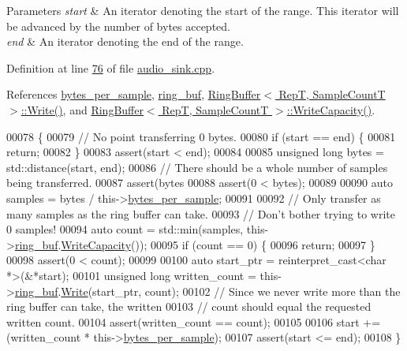 \begin{DoxyParams}{Parameters}
{\em start} & An iterator denoting the start of the range. This iterator will be advanced by the number of bytes accepted. \\
\hline
{\em end} & An iterator denoting the end of the range. \\
\hline
\end{DoxyParams}


Definition at line \hyperlink{audio__sink_8cpp_source_l00076}{76} of file \hyperlink{audio__sink_8cpp_source}{audio\+\_\+sink.\+cpp}.



References \hyperlink{audio__sink_8hpp_source_l00140}{bytes\+\_\+per\+\_\+sample}, \hyperlink{audio__sink_8hpp_source_l00143}{ring\+\_\+buf}, \hyperlink{ringbuffer_8hpp_source_l00120}{Ring\+Buffer$<$ Rep\+T, Sample\+Count\+T $>$\+::\+Write()}, and \hyperlink{ringbuffer_8hpp_source_l00083}{Ring\+Buffer$<$ Rep\+T, Sample\+Count\+T $>$\+::\+Write\+Capacity()}.


\begin{DoxyCode}
00078 \{
00079     \textcolor{comment}{// No point transferring 0 bytes.}
00080     \textcolor{keywordflow}{if} (start == end) \{
00081         \textcolor{keywordflow}{return};
00082     \}
00083     assert(start < end);
00084 
00085     \textcolor{keywordtype}{unsigned} \textcolor{keywordtype}{long} bytes = std::distance(start, end);
00086     \textcolor{comment}{// There should be a whole number of samples being transferred.}
00087     assert(bytes %
00088     assert(0 < bytes);
00089 
00090     \textcolor{keyword}{auto} samples = bytes / this->\hyperlink{classAudioSink_a5eab0f7111187c0416feb542010e4a2e}{bytes\_per\_sample};
00091 
00092     \textcolor{comment}{// Only transfer as many samples as the ring buffer can take.}
00093     \textcolor{comment}{// Don't bother trying to write 0 samples!}
00094     \textcolor{keyword}{auto} count = std::min(samples, this->\hyperlink{classAudioSink_a87184f85d6cfcc7310043b877caeaee2}{ring\_buf}.\hyperlink{classRingBuffer_ab00617ab6e379ad146cb7b80079f4c4c}{WriteCapacity}());
00095     \textcolor{keywordflow}{if} (count == 0) \{
00096         \textcolor{keywordflow}{return};
00097     \}
00098     assert(0 < count);
00099 
00100     \textcolor{keyword}{auto} start\_ptr = \textcolor{keyword}{reinterpret\_cast<}\textcolor{keywordtype}{char} *\textcolor{keyword}{>}(&*start);
00101     \textcolor{keywordtype}{unsigned} \textcolor{keywordtype}{long} written\_count = this->\hyperlink{classAudioSink_a87184f85d6cfcc7310043b877caeaee2}{ring\_buf}.\hyperlink{classRingBuffer_aa7f863968cb641946b0cf341bda11e16}{Write}(start\_ptr, count);
00102     \textcolor{comment}{// Since we never write more than the ring buffer can take, the written}
00103     \textcolor{comment}{// count should equal the requested written count.}
00104     assert(written\_count == count);
00105 
00106     start += (written\_count * this->\hyperlink{classAudioSink_a5eab0f7111187c0416feb542010e4a2e}{bytes\_per\_sample});
00107     assert(start <= end);
00108 \}
\end{DoxyCode}


